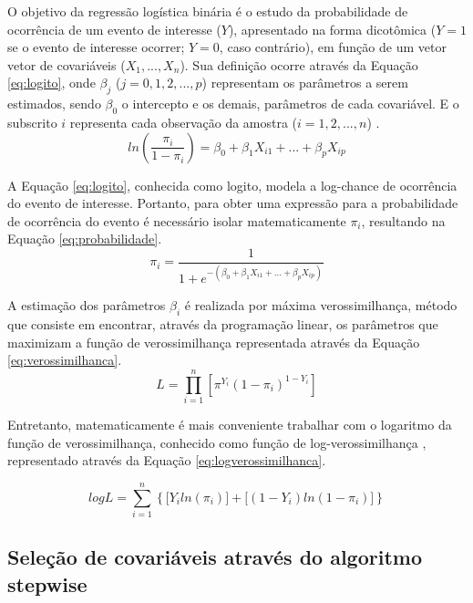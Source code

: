 \documentclass[twocolumn]{rbef}
\newcommand{\1}{\mathbbm{1}}
\begin{document}
O objetivo da regressão logística binária é o estudo da probabilidade de ocorrência de um evento de interesse (\(Y\)), apresentado na forma dicotômica (\(Y=1\) se o evento de interesse ocorrer; \(Y=0\), caso contrário), em função de um vetor vetor de covariáveis (\(X_1, ..., X_n\)). Sua definição ocorre através da Equação \eqref{eq:logito}, onde \(\beta_j\) (\(j = 0,1,2,...,p\)) representam os parâmetros a serem estimados, sendo \(\beta_0\) o intercepto e os demais, parâmetros de cada covariável. E o subscrito \(i\) representa cada observação da amostra (\(i = 1, 2,...,n\)) \cite{Favero2017}.
\begin{equation}
ln \left ( \dfrac{\pi_i}{1-\pi_i} \right ) = \beta_0 + \beta_1 X_{i1} + ... +  \beta_p X_{ip}\label{eq:logito}
\end{equation}

A Equação \eqref{eq:logito}, conhecida como logito, modela a log-chance de ocorrência do evento de interesse. Portanto, para obter uma expressão para a probabilidade de ocorrência do evento é necessário isolar matematicamente \(\pi_i\), resultando na Equação \eqref{eq:probabilidade}.
\begin{equation}
\pi_i = \dfrac{1}{1 + e^{-(\beta_0 + \beta_1 X_{i1} + ... +  \beta_p X_{ip})}}\label{eq:probabilidade}
\end{equation}

A estimação dos parâmetros \(\beta_i\) é realizada por máxima verossimilhança, método que consiste em encontrar, através da programação linear, os parâmetros que maximizam a função de verossimilhança representada através da Equação \eqref{eq:verossimilhanca}.
\begin{equation}
L =  \prod_{i=1}^{n} \left[ \pi^{Y_i} (1-\pi_i)^{1-Y_i} \right]\label{eq:verossimilhanca}
\end{equation}

Entretanto, matematicamente é mais conveniente trabalhar com o logaritmo da função de verossimilhança, conhecido como função de log-verossimilhança \cite{Favero2017,Botelho2010}, representado através da Equação \eqref{eq:logverossimilhanca}.

\begin{equation}
logL = \sum_{i=1}^{n} \left\{ \big[Y_iln(\pi_i)\big] + \big[(1-Y_i)ln(1-\pi_i)\big] \right\}\label{eq:logverossimilhanca}
\end{equation}

\hypertarget{seleuxe7uxe3o-de-covariuxe1veis-atravuxe9s-do-algoritmo-stepwise}{%
\subsection{Seleção de covariáveis através do algoritmo stepwise}\label{seleuxe7uxe3o-de-covariuxe1veis-atravuxe9s-do-algoritmo-stepwise}}
\end{document}
